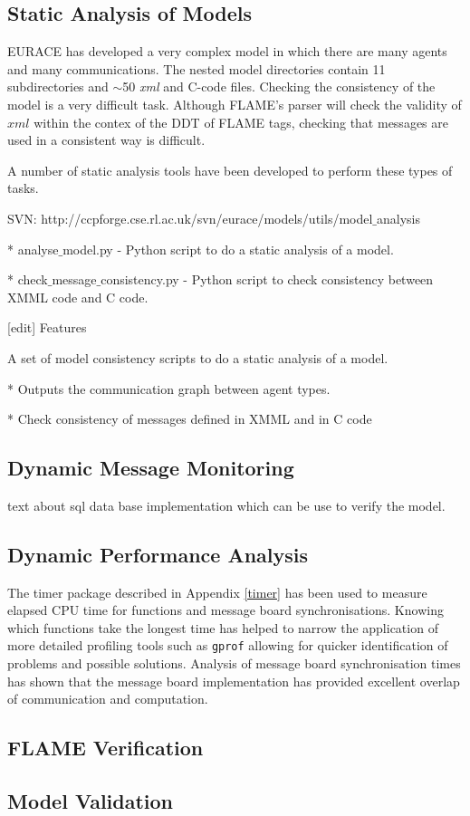 \subsection{Static Analysis of Models}


EURACE has developed a very complex model in which there are many agents and many communications. The nested model directories contain 11 subdirectories and $\sim$50 \textit{xml} and C-code files. Checking the consistency of the model is a very difficult task. Although FLAME's parser will check the validity of $xml$ within the contex of the DDT of FLAME tags, checking that messages are used in a consistent way is difficult.


A number of static analysis tools have been developed to perform these types of tasks.


SVN: http://ccpforge.cse.rl.ac.uk/svn/eurace/models/utils/model$\_$analysis


    * analyse$\_$model.py - Python script to do a static analysis of a model.

    * check$\_$message$\_$consistency.py - Python script to check consistency between XMML code and C code. 


[edit] Features


A set of model consistency scripts to do a static analysis of a model.


    * Outputs the communication graph between agent types.

    * Check consistency of messages defined in XMML and in C code 


\subsection{Dynamic Message Monitoring}


text about sql data base implementation which can be use to verify the model.


\subsection{Dynamic Performance Analysis}


The timer package described in Appendix \ref{timer} has been used to measure elapsed CPU time for functions and message board synchronisations. Knowing which functions take the longest time has helped to narrow the application of more detailed profiling tools such as \texttt{gprof} allowing for quicker identification of problems and possible solutions. Analysis of message board synchronisation times has shown that the message board implementation has provided excellent overlap of communication and computation.


\subsection {FLAME Verification}


\subsection{Model Validation}
